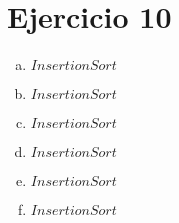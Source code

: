 \documentclass{article}
\begin{document}
    \section*{Ejercicio 10}
    \begin{enumerate}[a)]
        \item $ InsertionSort $
        \item $ InsertionSort $
        \item $ InsertionSort $
        \item $ InsertionSort $
        \item $ InsertionSort $
        \item $ InsertionSort $
    \end{enumerate}
\end{document}
